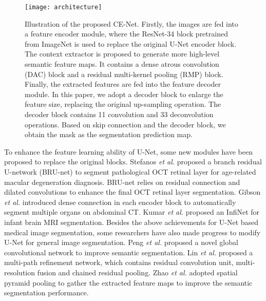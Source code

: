 \documentclass[journal]{IEEEtran}
\begin{document}
\begin{figure*}
	\centering
	\texttt{[image: architecture]}
	\caption{Illustration of the proposed CE-Net. Firstly, the images are fed into a feature encoder module, where the ResNet-34 block pretrained from ImageNet is used to replace the original U-Net encoder block.  The  context extractor is proposed to generate more high-level semantic feature maps. It contains a dense atrous convolution (DAC) block and a residual multi-kernel pooling (RMP) block.  Finally, the extracted features are fed into the feature decoder module. In this paper, we adopt a decoder block to enlarge the feature size, replacing the original up-sampling operation. The  decoder block  contains 11 convolution and 33 deconvolution operations. Based on skip connection and the decoder block, we  obtain the mask as the segmentation prediction map.}
	\label{2}
\end{figure*}


To enhance the feature learning ability of U-Net, some new  modules have been proposed to replace the original blocks. 
Stefanos \emph{et al.} \cite{apostolopoulos2017pathological} proposed a branch residual U-network (BRU-net) to segment pathological OCT retinal layer for age-related macular degeneration diagnosis. BRU-net relies on residual connection and dilated convolutions to enhance the final OCT retinal layer segmentation.  Gibson \emph{et al.} \cite{gibson2018automatic} introduced dense connection in each encoder block to automatically segment multiple organs on abdominal CT.  Kumar \emph{et al.} \cite{kumar2018infinet} proposed an InfiNet for infant brain MRI segmentation.
Besides the above achievements for  U-Net based medical image segmentation, some researchers have also  made progress to modify U-Net for   general image segmentation. Peng \emph{et al.} \cite{peng2017large} proposed a novel global convolutional network to improve semantic segmentation. Lin \emph{et al.} \cite{lin2017refinenet} proposed a multi-path refinement network, which contains residual convolution unit, multi-resolution fusion and chained residual pooling. Zhao \emph{et al.} \cite{zhao2017pyramid} adopted spatial pyramid pooling to gather the extracted feature maps to improve the semantic segmentation performance. 
\end{document}
